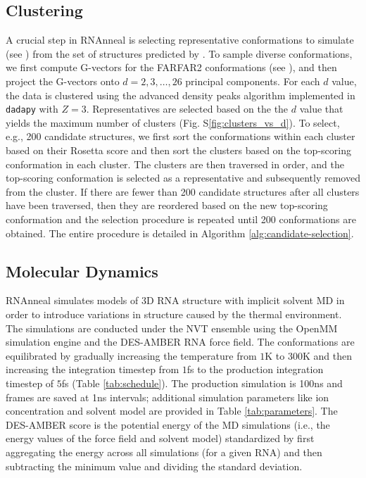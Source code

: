 \documentclass[%
aip,
 amsmath,amssymb,
reprint,%
twocolumn,
]{revtex4-1}
\makeatletter
\newcommand\setcurrentname[1]{\def\@currentlabelname{#1}}
\makeatother
\begin{document}
{\subsection*{Clustering}
\setcurrentname{Clustering}
\label{methods:representatives}

A crucial step in RNAnneal is selecting representative conformations to simulate (see ) from the set of structures predicted by . To sample diverse conformations, we first compute G-vectors for the FARFAR2 conformations (see ), and then project the G-vectors onto $d=2,3,\ldots,26$ principal components. For each $d$ value, the data is clustered using the advanced density peaks algorithm\cite{d2021automatic} implemented in \texttt{dadapy}\cite{glielmo2022dadapy} with $Z=3$. Representatives are selected based on the the $d$ value that yields the maximum number of clusters (Fig. S\ref{fig:clusters_vs_d}). To select, e.g., 200 candidate structures, we first sort the conformations within each cluster based on their Rosetta score and then sort the clusters based on the top-scoring conformation in each cluster. The clusters are then traversed in order, and the top-scoring conformation is selected as a representative and subsequently removed from the cluster. If there are fewer than 200 candidate structures after all clusters have been traversed, then they are reordered based on the new top-scoring conformation and the selection procedure is repeated until 200 conformations are obtained. The entire procedure is detailed in Algorithm \ref{alg:candidate-selection}.

\subsection*{Molecular Dynamics}
\setcurrentname{Molecular Dynamics}
\label{methods:molecular-dynamics}

RNAnneal simulates models of 3D RNA structure with implicit solvent MD in order to introduce variations in structure caused by the thermal environment. The simulations are conducted under the NVT ensemble using the OpenMM simulation engine and the DES-AMBER RNA force field.\cite{eastman2023openmm,tan2018rna} The conformations are equilibrated by gradually increasing the temperature from $1$K to $300$K and then increasing the integration timestep from $1$fs to the production integration timestep of $5$fs (Table \ref{tab:schedule}). The production simulation is 100ns and frames are saved at 1ns intervals; additional simulation parameters like ion concentration and solvent model are provided in Table \ref{tab:parameters}. The DES-AMBER score is the potential energy of the MD simulations (i.e., the energy values of the force field and solvent model) standardized by first aggregating the energy across all simulations (for a given RNA) and then subtracting the minimum value and dividing the standard deviation.

}
\end{document}
